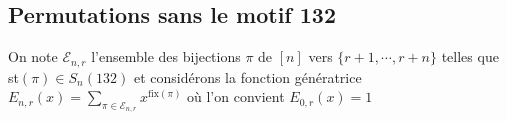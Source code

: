 \subsection{Permutations sans le motif 132}
On note $\mathcal{E}_{n,r}$ l'ensemble des bijections $\pi$ de $[n]$ vers $\{r+1, \cdots, r+n\}$ telles que \\
st$(\pi) \in S_{n}(132)$ et considérons la fonction génératrice $E_{n,r}(x) = \underset{\pi \in \mathcal{E}_{n,r}}{\sum}x^{\text{fix}(\pi)}$
où l'on convient $E_{0,r}(x)=1$

